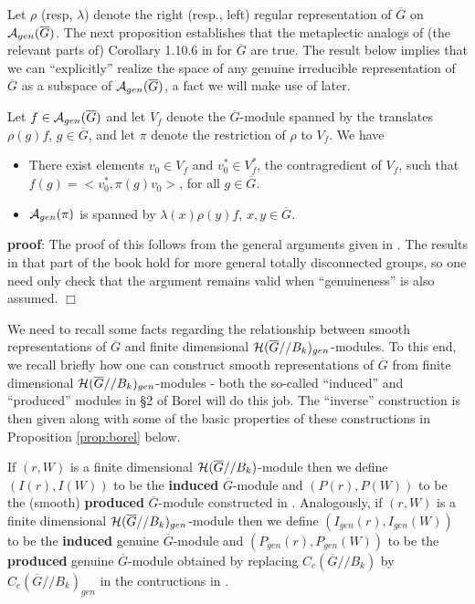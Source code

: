 Let $\rho$ (resp, $\lambda$) denote the right 
(resp., left) regular representation of $\overline{G}$ 
on ${\cal A}_{gen}(\overline{G})$.
The next proposition establishes that the metaplectic 
analogs of (the relevant parts of) Corollary 1.10.6 in
\cite{Sil} for $\overline{G}$ are true. The result below
implies that we can ``explicitly'' realize the space of any genuine
irreducible representation of $\overline{G}$ as a subspace
of ${\cal A}_{gen}(\overline{G})$, a fact we will make use of
later.

\begin{proposition} 
\label{prop:silberger}
Let $f\in {\cal A}_{gen}(\overline{G})$
and let $V_f$ denote the $\overline{G}$-module
spanned by the translates $\rho(g)f$,
$g\in \overline{G}$, and let $\pi$ denote
the restriction of $\rho$ to $V_f$. We have
\begin{itemize}
\item[(a)]
There exist elements $v_0\in V_f$ and $v_0^*\in V_f^*$,
the contragredient of $V_f$, such that
$f(g)=<v_0^*,\pi(g)v_0>$, for
all $g\in \overline{G}$.
\item[(b)]
${\cal A}_{gen}(\pi)$ is spanned by 
$\lambda(x)\rho(y)f$, $x,y\in \overline{G}$.
\end{itemize}
\end{proposition}

{\bf proof}:
The proof of this follows from the general
arguments given in \cite{Sil}. The results in that
part of the book \cite{Sil} hold for more
general totally disconnected groups,
so one need only check that the
argument remains valid when ``genuineness'' 
is also assumed.
$\Box$

We need to recall some facts regarding the relationship between 
smooth representations of $\overline{G}$ and finite dimensional
${\cal H}(\overline{G}//B_k)_{gen}$-modules. To this end,
we recall briefly how one can construct 
smooth representations of $\overline{G}$ from 
finite dimensional ${\cal H}(\overline{G}//B_k)_{gen}$-modules -
both the so-called ``induced'' and ``produced'' modules 
in \S 2 of Borel \cite{Bo} will do this job. 
The ``inverse'' construction is then given along with
some of the basic properties of these constructions
in Proposition \ref{prop:borel} below.

\begin{definition}
If $(r,W)$ is a finite dimensional 
${\cal H}(\overline{G}//B_k)$-module then we define 
$(I(r),I(W))$ to be the {\bf induced} $\overline{G}$-module
and $(P(r),P(W))$ to be the (smooth) {\bf produced} $\overline{G}$-module
constructed in \cite{Bo}. Analogously, if $(r,W)$ is a finite dimensional 
${\cal H}(\overline{G}//B_k)_{gen}$-module then we define 
$(I_{gen}(r),I_{gen}(W))$ to be the {\bf induced} genuine 
$\overline{G}$-module and 
$(P_{gen}(r),P_{gen}(W))$ to be the {\bf produced} genuine 
$\overline{G}$-module obtained by replacing 
$C_c(\overline{G}//B_k)$ by $C_c(\overline{G}//B_k)_{gen}$
in the contructions in \cite{Bo}.
\end{definition}

